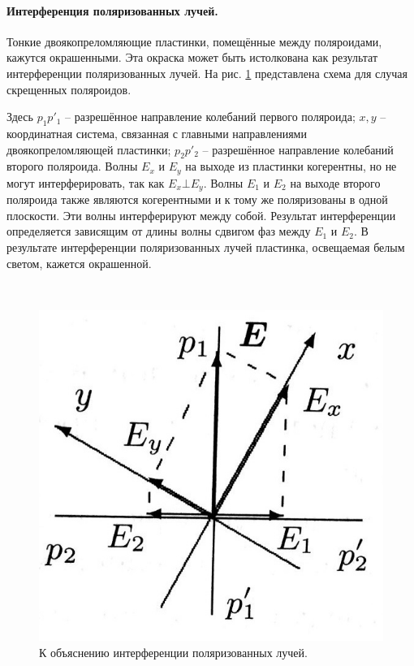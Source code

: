 \documentclass[a4paper, 12pt, twoside]{article}
\begin{document}
	 \paragraph{Интерференция поляризованных лучей.}
	 
	 Тонкие двоякопреломляющие пластинки, помещённые между поляроидами, кажутся окрашенными. Эта окраска может быть истолкована как результат интерференции поляризованных лучей. На рис. \ref{ris3} представлена схема для случая скрещенных поляроидов.
	 
	 \begin{minipage}{0.6\linewidth}
	 	Здесь $p_1 p'_1$ -- разрешённое направление колебаний первого поляроида; $x, y$ -- координатная система, связанная с главными направлениями двоякопреломляющей пластинки; $p_2 p'_2$ -- разрешённое направление колебаний второго поляроида. Волны $E_x$ и $E_y$ на выходе из пластинки когерентны, но не могут интерферировать, так как $E_x \bot E_y$. Волны $E_1$ и $E_2$ на выходе второго поляроида также являются когерентными и к тому же поляризованы в одной плоскости. Эти волны интерферируют между собой. Результат интерференции определяется зависящим от длины волны сдвигом фаз между $E_1$ и $E_2$. В результате интерференции поляризованных лучей пластинка, освещаемая белым светом, кажется окрашенной.
	 \end{minipage}
 	~
 	\begin{minipage}{0.3\linewidth}
 		\begin{figure}[H]
 			\centering
 			\includegraphics[width =  0.8\linewidth]{ris3}
 			\caption{К объяснению интерференции поляризованных лучей.}
 			\label{ris3}
 		\end{figure}
 	\end{minipage}
 
\end{document}
